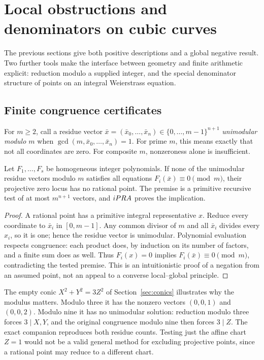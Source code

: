\section{Local obstructions and denominators on cubic curves}
\label{sec:local}

The previous sections give both positive descriptions and a global negative
result. Two further tools make the interface between geometry and finite
arithmetic explicit: reduction modulo a supplied integer, and the special
denominator structure of points on an integral Weierstrass equation.

\subsection{Finite congruence certificates}

For $m\ge2$, call a residue vector
$\bar x=(\bar x_0,\ldots,\bar x_n)\in\{0,\ldots,m-1\}^{n+1}$
\emph{unimodular modulo $m$} when
$\gcd(m,\bar x_0,\ldots,\bar x_n)=1$. For prime $m$, this means exactly
that not all coordinates are zero. For composite $m$, nonzeroness alone
is insufficient.

\begin{theorem}
\label{thm:modular}
Let $F_1,\ldots,F_s$ be homogeneous integer polynomials. If none of the
unimodular residue vectors modulo $m$ satisfies all equations
$F_i(\bar x)\equiv0\pmod m$, their projective zero locus has no rational
point. The premise is a primitive recursive test of at most $m^{n+1}$
vectors, and $iPRA$ proves the implication.
\end{theorem}
\begin{proof}
A rational point has a primitive integral representative $x$. Reduce every
coordinate to $\bar x_i$ in $[0,m-1]$. Any common divisor of $m$ and all
$\bar x_i$ divides every $x_i$, so it is one; hence the residue vector is
unimodular. Polynomial evaluation respects congruence: each product does,
by induction on its number of factors, and a finite sum does as well.
Thus $F_i(x)=0$ implies $F_i(\bar x)\equiv0\pmod m$, contradicting the
tested premise. This is an intuitionistic proof of a negation from an
assumed point, not an appeal to a converse local--global principle.
\end{proof}

The empty conic $X^2+Y^2=3Z^2$ of Section~\ref{sec:conics} illustrates
why the modulus matters. Modulo three it has the nonzero vectors
$(0,0,1)$ and $(0,0,2)$. Modulo nine it has no unimodular solution: reduction
modulo three forces $3\mid X,Y$, and the original congruence modulo nine
then forces $3\mid Z$. The exact companion reproduces both residue counts.
Testing just the affine chart $Z=1$ would not be a valid general method
for excluding projective points, since a rational point may reduce to a
different chart.

